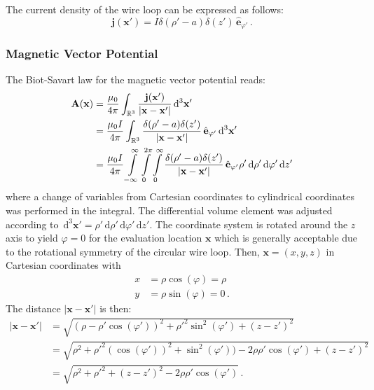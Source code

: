 The current density of the wire loop can be expressed as follows:
\begin{equation}
  \mathbf{j}(\mathbf{x}') = I \delta(\rho' - a) \delta(z') \,\hat{\mathbf{e}}_{\varphi'} \, .
\end{equation}

\subsubsection{Magnetic Vector Potential}
The Biot-Savart law for the magnetic vector potential reads:
\begin{align}
  \mathbf{A}(\mathbf{x}) &= \frac{\mu_0  }{4 \pi}
                            \int_{\mathbb{R}^3}
                              \frac{\mathbf{j}(\mathbf{x}')}{|\mathbf{x} - \mathbf{x}'|} \,\mathrm{d}^3\mathbf{x}' \nonumber \\
             ~           &= \frac{\mu_0 I}{4 \pi}
                            \int_{\mathbb{R}^3}
                              \frac{\delta(\rho' - a) \delta(z')}{|\mathbf{x} - \mathbf{x}'|} \,\hat{\mathbf{e}}_{\varphi'}
                              \,\mathrm{d}^3\mathbf{x}' \nonumber \\
             ~           &= \frac{\mu_0 I}{4 \pi}
                            \int\limits_{-\infty}^{\infty} \int\limits_{0}^{2 \pi} \int\limits_{0}^{\infty}
                              \frac{\delta(\rho' - a) \delta(z')}{|\mathbf{x} - \mathbf{x}'|} \,\hat{\mathbf{e}}_{\varphi'}
                              \rho' \,\mathrm{d} \rho' \,\mathrm{d} \varphi'  \,\mathrm{d} z' \label{eqn:vecpot_loop_general}
\end{align}
where a change of variables from Cartesian coordinates to cylindrical coordinates was performed in the integral.
The differential volume element was adjusted according to
$\,\mathrm{d}^3\mathbf{x}' = \rho' \,\mathrm{d} \rho' \,\mathrm{d} \varphi'  \,\mathrm{d} z'$.
The coordinate system is rotated around the $z$ axis to yield $\varphi=0$ for the evaluation location $\mathbf{x}$
which is generally acceptable due to the rotational symmetry of the circular wire loop.
Then, $\mathbf{x} = (x, y, z)$ in Cartesian coordinates with
\begin{align}
  x &= \rho \cos(\varphi) = \rho \\
  y &= \rho \sin(\varphi) = 0    \, .
\end{align}
The distance $|\mathbf{x} - \mathbf{x}'|$ is then:
\begin{align}
  |\mathbf{x} - \mathbf{x}'| &= \sqrt{(\rho - \rho' \cos(\varphi'))^2 + \rho'^2 \sin^2(\varphi') + (z - z')^2} \nonumber \\
              ~              &= \sqrt{ \rho^2 + \rho'^2 (\cos(\varphi'))^2 + \sin^2(\varphi')) - 2 \rho \rho' \cos(\varphi') + (z - z')^2} \nonumber \\
              ~              &= \sqrt{ \rho^2 + \rho'^2 + (z - z')^2 - 2 \rho \rho' \cos(\varphi')} \, .
\end{align}

